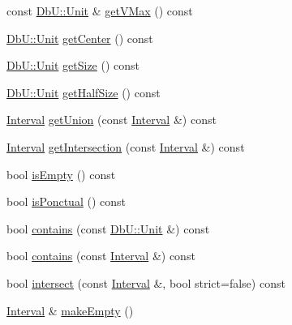 \begin{DoxyCompactItemize}
\item 
const \mbox{\hyperlink{group__DbUGroup_ga4fbfa3e8c89347af76c9628ea06c4146}{Db\+U\+::\+Unit}} \& \mbox{\hyperlink{classHurricane_1_1Interval_a2f5ec659fde913492f89dc215001acb2}{get\+V\+Max}} () const
\item 
\mbox{\hyperlink{group__DbUGroup_ga4fbfa3e8c89347af76c9628ea06c4146}{Db\+U\+::\+Unit}} \mbox{\hyperlink{classHurricane_1_1Interval_a6d12d0404054c7ccadab1afa6683a561}{get\+Center}} () const
\item 
\mbox{\hyperlink{group__DbUGroup_ga4fbfa3e8c89347af76c9628ea06c4146}{Db\+U\+::\+Unit}} \mbox{\hyperlink{classHurricane_1_1Interval_a61d877fee3986f93c357910cd63f1caa}{get\+Size}} () const
\item 
\mbox{\hyperlink{group__DbUGroup_ga4fbfa3e8c89347af76c9628ea06c4146}{Db\+U\+::\+Unit}} \mbox{\hyperlink{classHurricane_1_1Interval_abe66d75c0854ca0a76189801f0f7d0e3}{get\+Half\+Size}} () const
\item 
\mbox{\hyperlink{classHurricane_1_1Interval}{Interval}} \mbox{\hyperlink{classHurricane_1_1Interval_ac50b0e28faf03b54f81af109d942b569}{get\+Union}} (const \mbox{\hyperlink{classHurricane_1_1Interval}{Interval}} \&) const
\item 
\mbox{\hyperlink{classHurricane_1_1Interval}{Interval}} \mbox{\hyperlink{classHurricane_1_1Interval_a73130b484cf43ff3b48488780a926ead}{get\+Intersection}} (const \mbox{\hyperlink{classHurricane_1_1Interval}{Interval}} \&) const
\item 
bool \mbox{\hyperlink{classHurricane_1_1Interval_a5bf0292743d02f861a194c48c823c7ce}{is\+Empty}} () const
\item 
bool \mbox{\hyperlink{classHurricane_1_1Interval_acfc27bb7442f359db7d04c72fa8edeb8}{is\+Ponctual}} () const
\item 
bool \mbox{\hyperlink{classHurricane_1_1Interval_a84beba7ba34552e12e6cb9e462a94765}{contains}} (const \mbox{\hyperlink{group__DbUGroup_ga4fbfa3e8c89347af76c9628ea06c4146}{Db\+U\+::\+Unit}} \&) const
\item 
bool \mbox{\hyperlink{classHurricane_1_1Interval_af613eb138f2035f50cba47057a074b2e}{contains}} (const \mbox{\hyperlink{classHurricane_1_1Interval}{Interval}} \&) const
\item 
bool \mbox{\hyperlink{classHurricane_1_1Interval_af4862b82fe5b37cdb3986a3b05245469}{intersect}} (const \mbox{\hyperlink{classHurricane_1_1Interval}{Interval}} \&, bool strict=false) const
\item 
\mbox{\hyperlink{classHurricane_1_1Interval}{Interval}} \& \mbox{\hyperlink{classHurricane_1_1Interval_a1e171021dcd5c0dc7e8afb0b2324c5ee}{make\+Empty}} ()

\end{DoxyCompactItemize}
